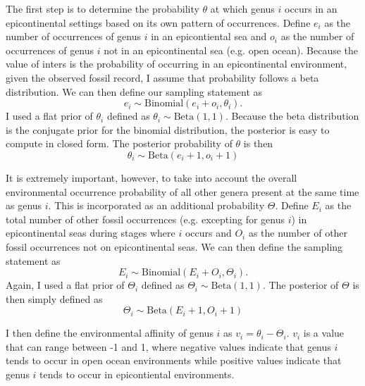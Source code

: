 \documentclass[12pt,letterpaper]{article}
\begin{document}
The first step is to determine the probability \(\theta\) at which genus \(i\) occurs in an epicontinental settings based on its own pattern of occurrences. Define \(e_{i}\) as the number of occurrences of genus \(i\) in an epicontiental sea and \(o_{i}\) as the number of occurrences of genus \(i\) not in an epicontinental sea (e.g. open ocean). Because the value of inters is the probability of occurring in an epicontinental environment, given the observed fossil record, I assume that probability follows a beta distribution. We can then define our sampling statement as
\begin{equation}
  e_{i} \sim \mathrm{Binomial}(e_{i} + o_{i}, \theta_{i}).
  \label{eq:epi_lik}
\end{equation}
I used a flat prior of \(\theta_{i}\) defined as \(\theta_{i} \sim \mathrm{Beta}(1, 1)\). Because the beta distribution is the conjugate prior for the binomial distribution, the posterior is easy to compute in closed form. The posterior probability of \(\theta\) is then 
\begin{equation}
  \theta_{i} \sim \mathrm{Beta}(e_{i} + 1, o_{i} + 1)
  \label{eq:epi_post}
\end{equation}

It is extremely important, however, to take into account the overall environmental occurrence probability of all other genera present at the same time as genus \(i\). This is incorporated as an additional probability \(\Theta\). Define \(E_{i}\) as the total number of other fossil occurrences (e.g. excepting for genus \(i\)) in epicontinental seas during stages where \(i\) occurs and \(O_{i}\) as the number of other fossil occurrences not on epicontinental seas. We can then define the sampling statement as
\begin{equation}
  E_{i} \sim \mathrm{Binomial}(E_{i} + O_{i}, \Theta_{i}).
  \label{eq:bck_lik}
\end{equation}
Again, I used a flat prior of \(\Theta_{i}\) defined as \(\Theta_{i} \sim \mathrm{Beta}(1, 1)\). The posterior of \(\Theta\) is then simply defined as
\begin{equation}
  \Theta_{i} \sim \mathrm{Beta}(E_{i} + 1, O_{i} + 1)
  \label{eq:bck_post}
\end{equation}

I then define the environmental affinity of genus \(i\) as \(v_{i} = \theta_{i} - \Theta_{i}\). \(v_{i}\) is a value that can range between -1 and 1, where negative values indicate that genus \(i\) tends to occur in open ocean environments while positive values indicate that genus \(i\) tends to occur in epicontiental environments.
\end{document}

